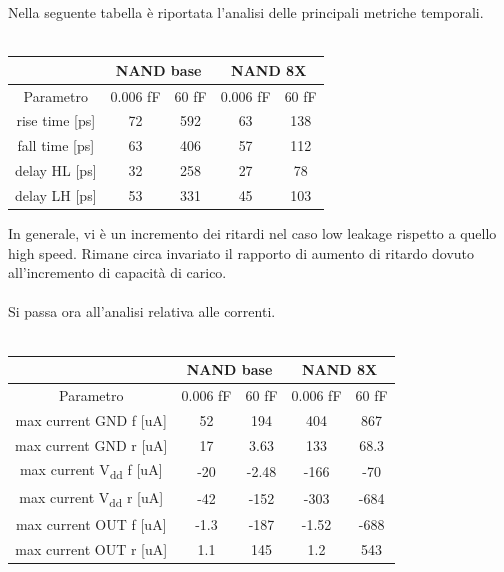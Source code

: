 \documentclass[11pt,  english, makeidx, a4paper, titlepage, oneside]{book}
\begin{document}
Nella seguente tabella è riportata l'analisi delle principali metriche temporali.
\\\\
\begin{center}
	\begin{tabular}{|c|c|c||c|c|}
	\hline
	& \multicolumn{2}{|c||}{NAND base} & \multicolumn{2}{|c|}{NAND 8X}\\
	\hline
	Parametro & 0.006 fF & 60 fF & 0.006 fF & 60 fF \\
	\hline
	rise time [ps] & 72 & 592 & 63 & 138\\
	\hline
	 fall time [ps] & 63 & 406 & 57 & 112 \\
	\hline
	delay HL [ps] & 32 & 258 & 27 & 78  \\
	\hline
	delay LH [ps] & 53 & 331 & 45 & 103 \\
	\hline
	\end{tabular}	
\end{center}
\vspace{0.3cm}
In generale, vi è un incremento dei ritardi nel caso low leakage rispetto a quello high speed. Rimane circa invariato il rapporto di aumento di ritardo dovuto all'incremento di capacità di carico.
\\\\
Si passa ora all'analisi relativa alle correnti.
\\\\
\begin{center}
	\begin{tabular}{|c|c|c||c|c|}
	\hline
	& \multicolumn{2}{c}{NAND base} & \multicolumn{2}{c}{NAND 8X}\\
	\hline
	Parametro & 0.006 fF & 60 fF & 0.006 fF & 60 fF \\
	\hline
	max current GND f [uA] & 52 & 194 & 404 & 867 \\
	\hline
	max current GND r [uA] & 17 & 3.63 & 133 & 68.3 \\
	\hline
	max current V\textsubscript{dd} f [uA] & -20 & -2.48 & -166 & -70 \\
	\hline
	max current V\textsubscript{dd} r [uA] & -42 & -152 & -303 & -684  \\
	\hline
	max current OUT f [uA] & -1.3 & -187 & -1.52 & -688 \\
	\hline
	max current OUT r [uA] & 1.1 & 145 & 1.2 & 543 \\
	\hline
	\end{tabular}	
\end{center}
\vspace{0.3cm}
\end{document}
